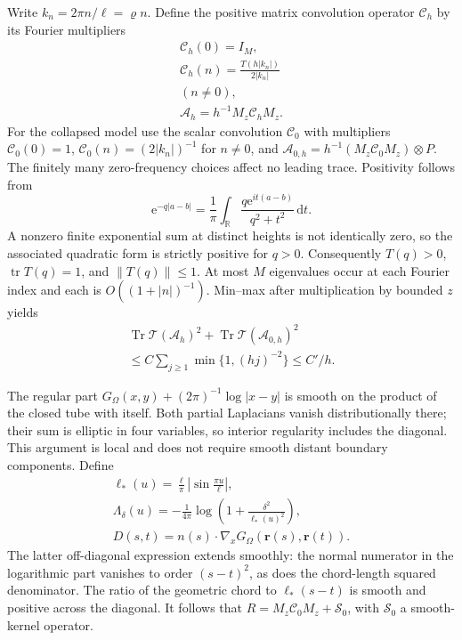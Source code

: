 \documentclass[aps,pra,reprint,superscriptaddress,longbibliography]{revtex4-2}
\newcommand{\Tr}{\operatorname{Tr}}
\newcommand{\dd}{\mathrm d}
\newcommand{\ee}{\mathrm e}
\newcommand{\norm}[1]{\left\lVert#1\right\rVert}
\begin{document}
Write $k_n=2\pi n/\ell=\varrho n$.  Define the positive matrix
convolution operator $\mathcal C_h$ by its Fourier multipliers
\begin{equation}
\begin{gathered}
 \mathcal C_h(0)=I_M,\\
 \mathcal C_h(n)=\frac{T(h|k_n|)}{2|k_n|}\\
(n\ne0),
 \\
 \mathcal A_h=h^{-1}M_z\mathcal C_hM_z.
 \label{sgt:geo:model}
\end{gathered}
\end{equation}
For the collapsed model use the scalar convolution $\mathcal C_0$
with multipliers $\mathcal C_0(0)=1$,
$\mathcal C_0(n)=(2|k_n|)^{-1}$ for $n\ne0$, and
$\mathcal A_{0,h}=h^{-1}(M_z\mathcal C_0M_z)\otimes P$.
The finitely many zero-frequency choices affect no leading trace.
Positivity follows from
\[
 \ee^{-q|a-b|}=\frac1\pi\int_{\mathbb R}
       \frac{q\ee^{it(a-b)}}{q^2+t^2}\,\dd t.
\]
A nonzero finite exponential sum at distinct heights is not identically
zero, so the associated quadratic form is strictly positive for $q>0$.
Consequently $T(q)>0$, $\operatorname{tr}T(q)=1$, and $\norm{T(q)}\leq1$.
At most $M$ eigenvalues occur at each Fourier index and each is
$O((1+|n|)^{-1})$.  Min--max after multiplication by bounded $z$ yields
\begin{equation}
\begin{gathered}
 \Tr\mathcal T(\mathcal A_h)^2+\Tr\mathcal T(\mathcal A_{0,h})^2
\\
 \leq C\sum_{j\geq1}\min\{1,(hj)^{-2}\}\leq C'/h.
 \label{sgt:geo:model-budget}
\end{gathered}
\end{equation}

The regular part
$G_\Omega(x,y)+(2\pi)^{-1}\log|x-y|$ is smooth on the product of
the closed tube with itself.  Both partial Laplacians vanish
distributionally there; their sum is elliptic in four variables, so
interior regularity includes the diagonal.  This argument is local
and does not require smooth distant boundary components.  Define
\[
\begin{gathered}
 \ell_*(u)=\frac\ell\pi\left|\sin\frac{\pi u}{\ell}\right|,
 \\
 \Lambda_\delta(u)=-\frac1{4\pi}
              \log\left(1+\frac{\delta^2}{\ell_*(u)^2}\right),
 \\
 D(s,t)=n(s)\cdot\nabla_xG_\Omega(\mathbf r(s),\mathbf r(t)).
\end{gathered}
\]
The latter off-diagonal expression extends smoothly: the normal
numerator in the logarithmic part vanishes to order $(s-t)^2$, as
does the chord-length squared denominator.  The ratio of the geometric
chord to $\ell_*(s-t)$ is smooth and positive across the diagonal.
It follows that $R=M_z\mathcal C_0M_z+\mathcal S_0$, with
$\mathcal S_0$ a smooth-kernel operator.
\end{document}
